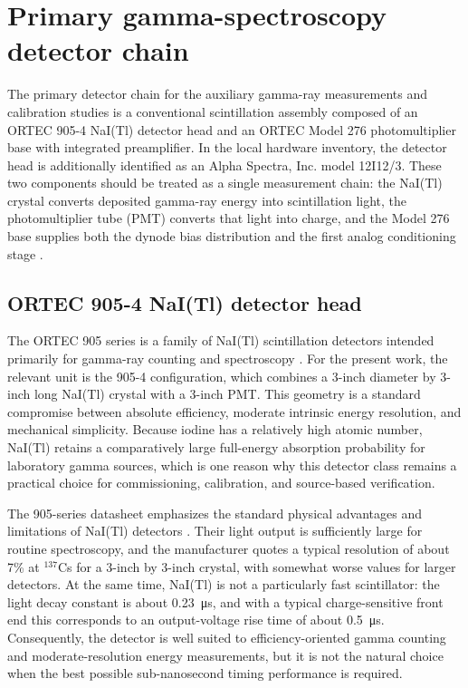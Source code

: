 \section{Primary gamma-spectroscopy detector chain}

The primary detector chain for the auxiliary gamma-ray measurements and calibration studies is a conventional scintillation assembly composed of an ORTEC 905-4 NaI(Tl) detector head and an ORTEC Model 276 photomultiplier base with integrated preamplifier. In the local hardware inventory, the detector head is additionally identified as an Alpha Spectra, Inc. model 12I12/3. These two components should be treated as a single measurement chain: the NaI(Tl) crystal converts deposited gamma-ray energy into scintillation light, the photomultiplier tube (PMT) converts that light into charge, and the Model 276 base supplies both the dynode bias distribution and the first analog conditioning stage \citep{ORTEC905SeriesManual,ORTEC276Manual}.

\subsection{ORTEC 905-4 NaI(Tl) detector head}

The ORTEC 905 series is a family of NaI(Tl) scintillation detectors intended primarily for gamma-ray counting and spectroscopy \citep{ORTEC905SeriesManual}. For the present work, the relevant unit is the 905-4 configuration, which combines a 3-inch diameter by 3-inch long NaI(Tl) crystal with a 3-inch PMT. This geometry is a standard compromise between absolute efficiency, moderate intrinsic energy resolution, and mechanical simplicity. Because iodine has a relatively high atomic number, NaI(Tl) retains a comparatively large full-energy absorption probability for laboratory gamma sources, which is one reason why this detector class remains a practical choice for commissioning, calibration, and source-based verification.

The 905-series datasheet emphasizes the standard physical advantages and limitations of NaI(Tl) detectors \citep{ORTEC905SeriesManual}. Their light output is sufficiently large for routine spectroscopy, and the manufacturer quotes a typical resolution of about 7\% at $^{137}$Cs for a 3-inch by 3-inch crystal, with somewhat worse values for larger detectors. At the same time, NaI(Tl) is not a particularly fast scintillator: the light decay constant is about \SI{0.23}{\micro\second}, and with a typical charge-sensitive front end this corresponds to an output-voltage rise time of about \SI{0.5}{\micro\second}. Consequently, the detector is well suited to efficiency-oriented gamma counting and moderate-resolution energy measurements, but it is not the natural choice when the best possible sub-nanosecond timing performance is required.

